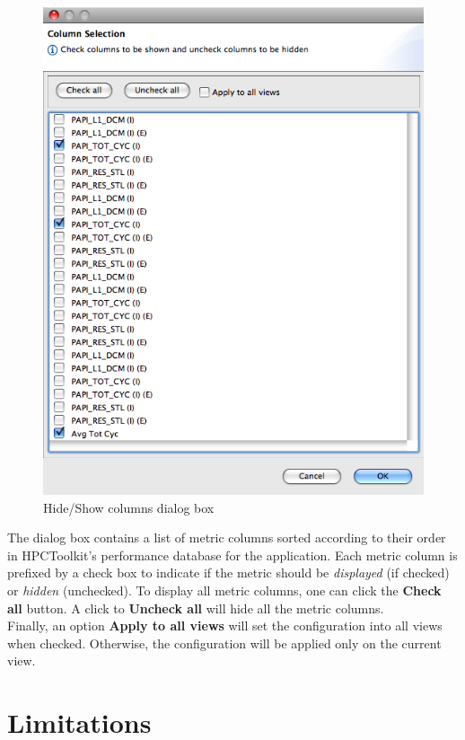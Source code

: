 \documentclass[a4paper,11pt]{article}
\begin{document}
\begin{figure}
\begin{center}
\includegraphics[width=6in]{images/HideShowColumns.png}
\caption{Hide/Show columns dialog box}
\end{center}
\end{figure}

 The dialog box contains a list of metric columns sorted according to their order in HPCToolkit's performance database for the application. Each metric column is prefixed by a check box to indicate if the metric should be \textit{displayed} (if checked) or \textit{hidden} (unchecked). To display all metric columns, one can click the \textbf{Check all} button. A click to \textbf{Uncheck all} will hide all the metric columns.
\\ Finally, an option \textbf{Apply to all views} will set the configuration into all views when checked.  Otherwise, the configuration will be applied only on the current view.  

\section{Limitations}
\end{document}
